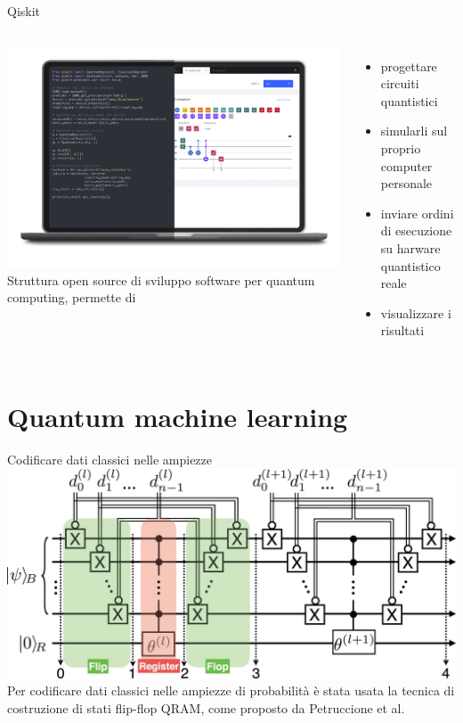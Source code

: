 \documentclass{beamer}
\begin{document}
    \begin{frame}{Qiskit}
        \begin{columns}
            \includegraphics[width=\textwidth]{gfx/laptop_strumenti.png}
            Struttura open source di sviluppo software per quantum computing, permette di 
            \begin{itemize}
                \item progettare circuiti quantistici
                \item simularli sul proprio computer personale
                \item inviare ordini di esecuzione su harware quantistico reale
                \item visualizzare i risultati
            \end{itemize}
        \end{columns}
    \end{frame}

    \section{Quantum machine learning}

    \begin{frame}{Codificare dati classici nelle ampiezze}
        \includegraphics[width=\textwidth]{gfx/qram.png}
        Per codificare dati classici nelle ampiezze di probabilità è stata usata la tecnica di costruzione 
        di stati flip-flop QRAM, come proposto da Petruccione et al.
    \end{frame}
\end{document}

